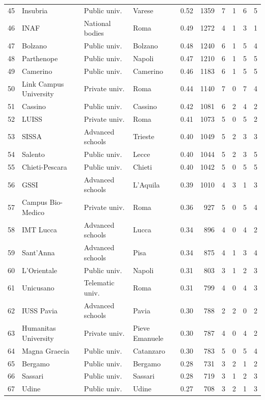\documentclass[11pt,a4paper]{article}
\begin{document}
{\begin{longtable}{rlllrrrrrr}
45 & Insubria & Public univ. & Varese & 0.52 & 1359 & 7 & 1 & 6 & 5 \\
46 & INAF & National bodies & Roma & 0.49 & 1272 & 4 & 1 & 3 & 1 \\
47 & Bolzano & Public univ. & Bolzano & 0.48 & 1240 & 6 & 1 & 5 & 4 \\
48 & Parthenope & Public univ. & Napoli & 0.47 & 1210 & 6 & 1 & 5 & 5 \\
49 & Camerino & Public univ. & Camerino & 0.46 & 1183 & 6 & 1 & 5 & 5 \\
50 & Link Campus University & Private univ. & Roma & 0.44 & 1140 & 7 & 0 & 7 & 4 \\
51 & Cassino & Public univ. & Cassino & 0.42 & 1081 & 6 & 2 & 4 & 2 \\
52 & LUISS & Private univ. & Roma & 0.41 & 1073 & 5 & 0 & 5 & 2 \\
53 & SISSA & Advanced schools & Trieste & 0.40 & 1049 & 5 & 2 & 3 & 3 \\
54 & Salento & Public univ. & Lecce & 0.40 & 1044 & 5 & 2 & 3 & 5 \\
55 & Chieti-Pescara & Public univ. & Chieti & 0.40 & 1042 & 5 & 0 & 5 & 5 \\
56 & GSSI & Advanced schools & L'Aquila & 0.39 & 1010 & 4 & 3 & 1 & 3 \\
57 & Campus Bio-Medico & Private univ. & Roma & 0.36 & 927 & 5 & 0 & 5 & 4 \\
58 & IMT Lucca & Advanced schools & Lucca & 0.34 & 896 & 4 & 0 & 4 & 2 \\
59 & Sant'Anna & Advanced schools & Pisa & 0.34 & 875 & 4 & 1 & 3 & 4 \\
60 & L'Orientale & Public univ. & Napoli & 0.31 & 803 & 3 & 1 & 2 & 3 \\
61 & Unicusano & Telematic univ. & Roma & 0.31 & 799 & 4 & 0 & 4 & 3 \\
62 & IUSS Pavia & Advanced schools & Pavia & 0.30 & 788 & 2 & 2 & 0 & 2 \\
63 & Humanitas University & Private univ. & Pieve Emanuele & 0.30 & 787 & 4 & 0 & 4 & 2 \\
64 & Magna Graecia & Public univ. & Catanzaro & 0.30 & 783 & 5 & 0 & 5 & 4 \\
65 & Bergamo & Public univ. & Bergamo & 0.28 & 731 & 3 & 2 & 1 & 2 \\
66 & Sassari & Public univ. & Sassari & 0.28 & 719 & 3 & 1 & 2 & 3 \\
67 & Udine & Public univ. & Udine & 0.27 & 708 & 3 & 2 & 1 & 3 \\

\end{longtable}}
\end{document}
